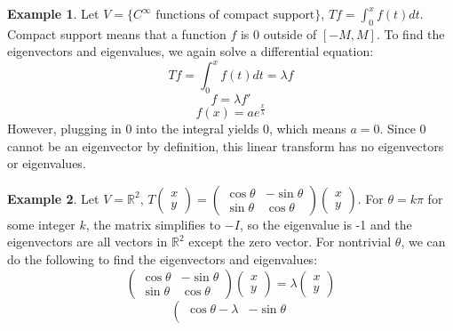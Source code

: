 \documentclass{article}
\theoremstyle{definition}
\newtheorem{examples}{Example}[section]
\begin{document}
\begin{examples}
	Let $V=\{\text{$C^\infty$ functions of compact support}\}$, $Tf=\int_0^xf(t)dt$. Compact support means that a function $f$ is 0 outside of $[-M, M]$. To find the eigenvectors and eigenvalues, we again solve a differential equation:
	$$Tf=\int_0^xf(t)dt=\lambda f$$
	$$f=\lambda f'$$
	$$f(x)=ae^\frac{x}{\lambda}$$
	However, plugging in 0 into the integral yields 0, which means $a=0$. Since 0 cannot be an eigenvector by definition, this linear transform has no eigenvectors or eigenvalues.
\end{examples}

\begin{examples}
	Let $V=\mathbb{R}^2$, \begin{math}
		T\left(
			\begin{matrix}
				x \\
				y
			\end{matrix}
		\right) = \left(
			\begin{matrix}
				\cos\theta & -\sin\theta \\
				\sin\theta & \cos\theta
			\end{matrix}
		\right) \left(
			\begin{matrix}
				x \\
				y
			\end{matrix}
		\right)
	\end{math}. For $\theta=k\pi$ for some integer $k$, the matrix simplifies to $-I$, so the eigenvalue is -1 and the eigenvectors are all vectors in $\mathbb{R}^2$ except the zero vector. For nontrivial $\theta$, we can do the following to find the eigenvectors and eigenvalues:
	\begin{equation*}
		\left(
			\begin{matrix}
				\cos\theta & -\sin\theta \\
				\sin\theta & \cos\theta
			\end{matrix}
		\right) \left(
			\begin{matrix}
				x \\
				y
			\end{matrix}
		\right)=\lambda \left(
			\begin{matrix}
				x \\
				y
			\end{matrix}
		\right)
	\end{equation*}
	\begin{equation*}
		\left(
			\begin{matrix}
				\cos\theta-\lambda & -\sin\theta \\

\end{matrix}
\end{equation*}
\end{examples}
\end{document}
